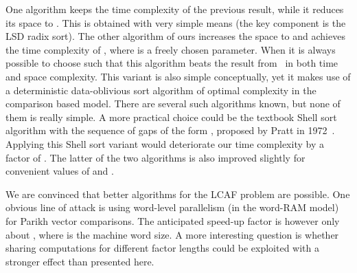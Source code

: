 \documentclass{llncs}
\begin{document}
One algorithm keeps the time complexity of the previous result, 
while it reduces its space to .
This is obtained with very simple means (the key component is 
the LSD radix sort).
The other algorithm of ours increases the space to 
and achieves the time complexity of , 
where  is a freely chosen parameter.
When  it is always possible to 
choose such  that this algorithm beats the result from~\cite{AILR2015} 
in both time and space complexity.
This variant is also simple conceptually, yet it makes use 
of a deterministic data-oblivious sort algorithm of optimal complexity 
in the comparison based model.
There are several such algorithms known, but none of them is really simple. 
A more practical choice could be the textbook Shell sort algorithm 
with the sequence of gaps of the form , proposed 
by Pratt in 1972~\cite{P1972}.
Applying this Shell sort variant would deteriorate our time complexity 
by a factor of .
The latter of the two algorithms is also improved slightly 
for convenient values of  and .

We are convinced that better algorithms for the LCAF problem are possible.
One obvious line of attack is using word-level parallelism
(in the word-RAM model) for Parikh vector comparisons.
The anticipated speed-up factor is however only about , 
where  is the machine word size.
A more interesting question is whether sharing computations 
for different factor lengths could be exploited with a stronger effect 
than presented here.




\end{document}

